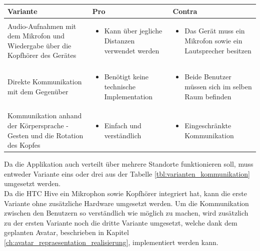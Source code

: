 \begin{center}
	\begin{tabularx} {\textwidth} { | B | B | B | }
		\hline
		\color{white} \textbf{Variante} & \color{white} \textbf{Pro} & 
		\color{white} \textbf{Contra} \\
		\hline
		\vspace{1pt}
		Audio-Aufnahmen mit dem Mikrofon und Wiedergabe über die Kopfhörer des Gerätes & 
		\begin{itemize} [leftmargin=*,noitemsep,topsep=0pt]
			\item Kann über jegliche Distanzen verwendet werden
		\end{itemize} & 
		\begin{itemize} [leftmargin=*,noitemsep,topsep=0pt]
			\item Das Gerät muss ein Mikrofon sowie ein Lautsprecher besitzen
		\end{itemize} \\
		\hline
		\vspace{1pt}
		Direkte Kommunikation mit dem Gegenüber & 
		\begin{itemize} [leftmargin=*,noitemsep,topsep=0pt]
			\item Benötigt keine technische Implementation
		\end{itemize} & 
		\begin{itemize} [leftmargin=*,noitemsep,topsep=0pt]
			\item Beide Benutzer müssen sich im selben Raum befinden
		\end{itemize} \\
		\hline
		\vspace{1pt}
		Kommunikation anhand der Körpersprache - Gesten und die Rotation des Kopfes & 
		\begin{itemize} [leftmargin=*,noitemsep,topsep=0pt]
			\item Einfach und verständlich
		\end{itemize} & 
		\begin{itemize} [leftmargin=*,noitemsep,topsep=0pt]
			\item Eingeschränkte Kommunikation
		\end{itemize} \\
		\hline	
	\end{tabularx}
\end{center}
\label{tbl:varianten_kommunikation}

\bigskip
Da die Applikation auch verteilt über mehrere Standorte funktionieren soll, muss entweder Variante eins oder drei aus der Tabelle \ref{tbl:varianten_kommunikation} umgesetzt werden.  \\
Da die HTC Hive ein Mikrophon sowie Kopfhörer integriert hat, kann die erste Variante ohne zusätzliche Hardware umgesetzt werden. Um die Kommunikation zwischen den Benutzern so verständlich wie möglich zu machen, wird zusätzlich zu der ersten Variante noch die dritte Variante umgesetzt, welche dank dem geplanten Avatar, beschrieben in Kapitel \ref{ch:avatar_repraesentation_realisierung}, implementiert werden kann.


